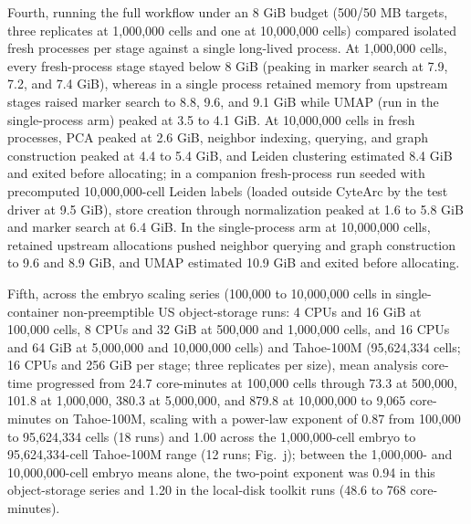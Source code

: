 Fourth, running the full workflow under an 8 GiB budget (500/50 MB targets, three replicates at 1,000,000 cells and one at 10,000,000 cells) compared isolated fresh processes per stage against a single long-lived process. At 1,000,000 cells, every fresh-process stage stayed below 8 GiB (peaking in marker search at 7.9, 7.2, and 7.4 GiB), whereas in a single process retained memory from upstream stages raised marker search to 8.8, 9.6, and 9.1 GiB while UMAP (run in the single-process arm) peaked at 3.5 to 4.1 GiB. At 10,000,000 cells in fresh processes, PCA peaked at 2.6 GiB, neighbor indexing, querying, and graph construction peaked at 4.4 to 5.4 GiB, and Leiden clustering estimated 8.4 GiB and exited before allocating; in a companion fresh-process run seeded with precomputed 10,000,000-cell Leiden labels (loaded outside CyteArc by the test driver at 9.5 GiB), store creation through normalization peaked at 1.6 to 5.8 GiB and marker search at 6.4 GiB. In the single-process arm at 10,000,000 cells, retained upstream allocations pushed neighbor querying and graph construction to 9.6 and 8.9 GiB, and UMAP estimated 10.9 GiB and exited before allocating.

Fifth, across the embryo scaling series (100,000 to 10,000,000 cells in single-container non-preemptible US object-storage runs: 4 CPUs and 16 GiB at 100,000 cells, 8 CPUs and 32 GiB at 500,000 and 1,000,000 cells, and 16 CPUs and 64 GiB at 5,000,000 and 10,000,000 cells) and Tahoe-100M (95,624,334 cells; 16 CPUs and 256 GiB per stage; three replicates per size), mean analysis core-time progressed from 24.7 core-minutes at 100,000 cells through 73.3 at 500,000, 101.8 at 1,000,000, 380.3 at 5,000,000, and 879.8 at 10,000,000 to 9,065 core-minutes on Tahoe-100M, scaling with a power-law exponent of 0.87 from 100,000 to 95,624,334 cells (18 runs) and 1.00 across the 1,000,000-cell embryo to 95,624,334-cell Tahoe-100M range (12 runs; Fig.~j); between the 1,000,000- and 10,000,000-cell embryo means alone, the two-point exponent was 0.94 in this object-storage series and 1.20 in the local-disk toolkit runs (48.6 to 768 core-minutes).

\label{note:Artifact reuse and reference revision}

